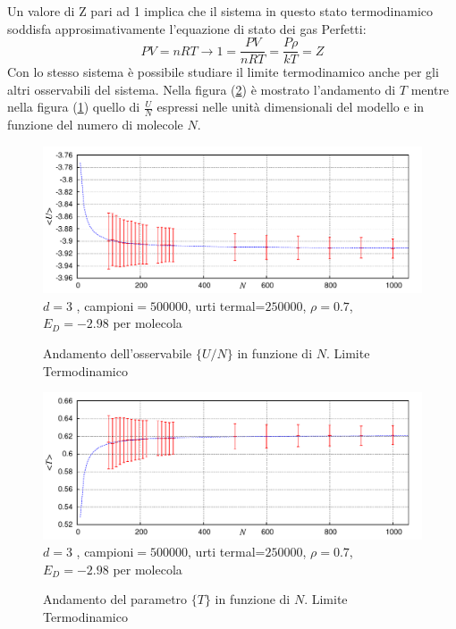 Un valore di Z pari ad 1 implica che il sistema in questo stato termodinamico soddisfa approsimativamente l'equazione di stato dei gas Perfetti:
\begin{displaymath}
 P V = n R T \rightarrow 1= \dfrac{P V}{n R T} =\dfrac{P \rho}{kT} = Z
\end{displaymath}
\newline \bigskip
Con lo stesso sistema è possibile studiare il limite termodinamico anche per gli altri osservabili del sistema.
Nella figura (\ref{fig: Limite Termo T}) è mostrato l'andamento di $T$ mentre nella figura (\ref{fig: Limite Termo U}) quello di $\frac{U}{N}$ espressi nelle unità dimensionali del modello e in funzione del numero di molecole $N$.
\begin{figure}[htbp]
\centering
	\caption[Sfere Soffici$/$Problema12.cpp $\quad \rightarrow \quad$ UvsN\_file.p]{Andamento dell'osservabile $\lbrace U/N \rbrace$ in funzione di $N$. Limite Termodinamico }\vspace{-15pt}
	\includegraphics[scale=0.95]{Immagini/Soffici/UvsN3D}
	\newline\footnotesize{ $d=3$ , campioni$= 500000$,  urti termal=$ 250000$, $\rho = 0.7$,	$E_D=-2.98$ per molecola}	\label{fig: Limite Termo U}
\end{figure}
\begin{figure}[htbp]
\centering
	\caption[Sfere Soffici$/$Problema12.cpp $\quad \rightarrow \quad$ TvsN\_file.p]{Andamento del parametro $\lbrace T \rbrace$ in funzione di $N$. Limite Termodinamico }\vspace{-15pt}
	\includegraphics[scale=0.95]{Immagini/Soffici/TvsN3D}
	\newline\footnotesize{ $d=3$ , campioni$= 500000$,  urti termal=$ 250000$, $\rho = 0.7$,	$E_D=-2.98$ per molecola}	\label{fig: Limite Termo T}
\end{figure}
